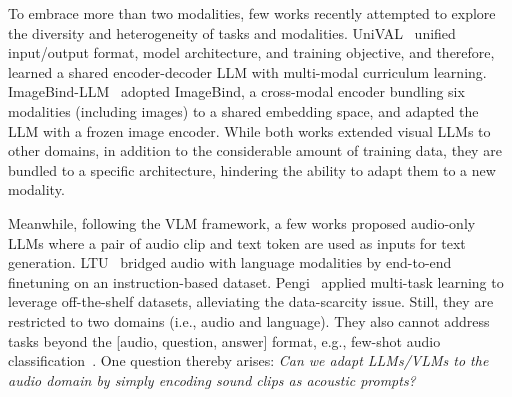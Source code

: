 \documentclass{article} %
\begin{document}
To embrace more than two modalities, few works recently attempted to explore the diversity and heterogeneity of tasks and modalities. UniVAL~\citep{shukor_unified_2023} unified input/output format, model architecture, and training objective, and therefore, learned a shared encoder-decoder LLM with multi-modal curriculum learning. ImageBind-LLM~\citep{han_imagebind-llm_2023} adopted ImageBind, a cross-modal encoder bundling six modalities (including images) to a shared embedding space, and adapted the LLM with a frozen image encoder. While both works extended visual LLMs to other domains, in addition to the considerable amount of training data, they are bundled to a specific architecture, hindering the ability to adapt them to a new modality.

Meanwhile, following the VLM framework, a few works proposed audio-only LLMs where a pair of audio clip and text token are used as inputs for text generation. LTU~\citep{gong_listen_2023} bridged audio with language modalities by end-to-end finetuning on an instruction-based dataset. Pengi~\citep{deshmukh_pengi_2023} applied multi-task learning to leverage off-the-shelf datasets, alleviating the data-scarcity issue. Still, they are restricted to two domains (i.e., audio and language). They also cannot address tasks beyond the [audio, question, answer] format, e.g., few-shot audio classification~\citep{liang_adapting_2023}. One question thereby arises: \textit{Can we adapt LLMs/VLMs to the audio domain by simply encoding sound clips as acoustic prompts?}
\end{document}

